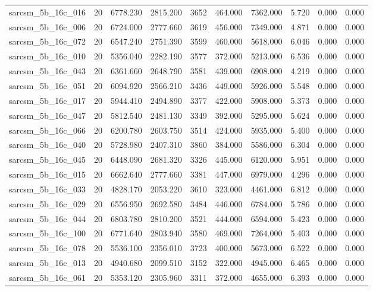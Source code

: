 \begin{tabular}{lrrrrrrrrr}
sarcsm\_5b\_16c\_016 & 20 & 6778.230 & 2815.200 & 3652 & 464.000 & 7362.000 & 5.720 & 0.000 & 0.000 \\
sarcsm\_5b\_16c\_006 & 20 & 6724.000 & 2777.660 & 3619 & 456.000 & 7349.000 & 4.871 & 0.000 & 0.000 \\
sarcsm\_5b\_16c\_072 & 20 & 6547.240 & 2751.390 & 3599 & 460.000 & 5618.000 & 6.046 & 0.000 & 0.000 \\
sarcsm\_5b\_16c\_010 & 20 & 5356.040 & 2282.190 & 3577 & 372.000 & 5213.000 & 6.536 & 0.000 & 0.000 \\
sarcsm\_5b\_16c\_043 & 20 & 6361.660 & 2648.790 & 3581 & 439.000 & 6908.000 & 4.219 & 0.000 & 0.000 \\
sarcsm\_5b\_16c\_051 & 20 & 6094.920 & 2566.210 & 3436 & 449.000 & 5926.000 & 5.548 & 0.000 & 0.000 \\
sarcsm\_5b\_16c\_017 & 20 & 5944.410 & 2494.890 & 3377 & 422.000 & 5908.000 & 5.373 & 0.000 & 0.000 \\
sarcsm\_5b\_16c\_047 & 20 & 5812.540 & 2481.130 & 3349 & 392.000 & 5295.000 & 5.624 & 0.000 & 0.000 \\
sarcsm\_5b\_16c\_066 & 20 & 6200.780 & 2603.750 & 3514 & 424.000 & 5935.000 & 5.400 & 0.000 & 0.000 \\
sarcsm\_5b\_16c\_040 & 20 & 5728.980 & 2407.310 & 3860 & 384.000 & 5586.000 & 6.304 & 0.000 & 0.000 \\
sarcsm\_5b\_16c\_045 & 20 & 6448.090 & 2681.320 & 3326 & 445.000 & 6120.000 & 5.951 & 0.000 & 0.000 \\
sarcsm\_5b\_16c\_015 & 20 & 6662.640 & 2777.660 & 3381 & 447.000 & 6979.000 & 4.296 & 0.000 & 0.000 \\
sarcsm\_5b\_16c\_033 & 20 & 4828.170 & 2053.220 & 3610 & 323.000 & 4461.000 & 6.812 & 0.000 & 0.000 \\
sarcsm\_5b\_16c\_029 & 20 & 6556.950 & 2692.580 & 3484 & 446.000 & 6784.000 & 5.786 & 0.000 & 0.000 \\
sarcsm\_5b\_16c\_044 & 20 & 6803.780 & 2810.200 & 3521 & 444.000 & 6594.000 & 5.423 & 0.000 & 0.000 \\
sarcsm\_5b\_16c\_100 & 20 & 6771.640 & 2803.940 & 3580 & 469.000 & 7264.000 & 5.403 & 0.000 & 0.000 \\
sarcsm\_5b\_16c\_078 & 20 & 5536.100 & 2356.010 & 3723 & 400.000 & 5673.000 & 6.522 & 0.000 & 0.000 \\
sarcsm\_5b\_16c\_013 & 20 & 4940.680 & 2099.510 & 3152 & 322.000 & 4945.000 & 6.465 & 0.000 & 0.000 \\
sarcsm\_5b\_16c\_061 & 20 & 5353.120 & 2305.960 & 3311 & 372.000 & 4655.000 & 6.393 & 0.000 & 0.000 \\

\end{tabular}
